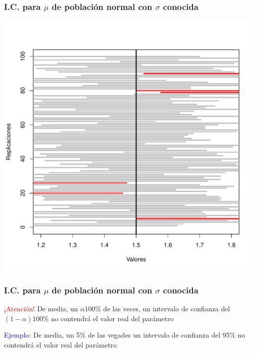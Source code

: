 \documentclass[12pt,t]{beamer}\usepackage[]{graphicx}\usepackage[]{color}
\newenvironment{knitrout}{}{} %
\newcommand{\red}[1]{\textcolor{red}{#1}}
\newcommand{\blue}[1]{\textcolor{blue}{#1}}
\theoremstyle{plain}
\theoremstyle{definition}
\begin{document}
\begin{frame}

\frametitle{I.C. para $\mu$ de población normal con $\sigma$ conocida}
\vspace*{-1cm}

\begin{knitrout}
\color{fgcolor}
\includegraphics[width=0.9\linewidth]{figure/plot_intervalos-1} 

\end{knitrout}




\end{frame}

\begin{frame}[fragile]
\frametitle{I.C. para $\mu$ de población normal con $\sigma$ conocida}

\begin{block}{\red{¡Atención!}}
De media, un $\alpha100\%$ de las veces, un intervalo de confianza  del $(1-\alpha)100\%$  no contendrá el valor real del parámetro 
\end{block}

\blue{Ejemplo}: De media, un 5\% de las vegades un intervalo de confianza  del 95\% no contendrá el valor real del parámetro

\end{frame}
\end{document}
